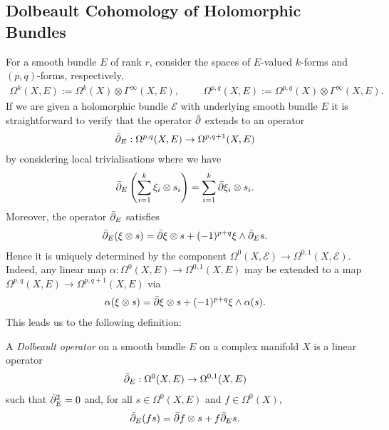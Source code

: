 \documentclass[12pt]{ociamthesis}  %
\begin{document}
\subsection{Dolbeault Cohomology of Holomorphic Bundles}

For a smooth bundle $E$ of rank $r$, consider the spaces of
$E$-valued $k$-forms and $(p,q)$-forms, respectively,
\begin{align*}
  \Omega^k(X,E) := \Omega^k(X)\otimes\Gamma^\infty(X,E),\hspace{1cm}
  \Omega^{p,q}(X,E) := \Omega^{p,q}(X)\otimes\Gamma^\infty(X,E).
\end{align*}
If we are given a holomorphic bundle $\mathcal E$ with underlying
smooth bundle $E$
it is straightforward to verify that the operator $\bar{\partial}$ extends
to an operator
\begin{align}\label{eq:general_dolbeault_operator}
  \bar{\partial}_E : \Omega^{p,q}(X,E) \to \Omega^{p,q+1}(X,E)
\end{align}
by considering local trivialisations where we have
\begin{align*}
  \bar{\partial}_E \left({\sum_{i=1}^k \xi_i \otimes s_i}\right)
  = \sum_{i=1}^k \bar{\partial} \xi_i \otimes s_i.
\end{align*}
Moreover, the operator $\bar{\partial}_E$ satisfies
\begin{align*}
  \bar{\partial}_E(\xi \otimes s) = \bar{\partial}\xi \otimes s + (-1)^{p+q} \xi \wedge \bar{\partial}_E s.
\end{align*}
Hence it is uniquely determined by the component
$\Omega^0(X,\mathcal E) \to \Omega^{0,1}(X,\mathcal E)$. Indeed,
any linear map $\alpha : \Omega^0(X,E) \to \Omega^{0,1}(X,E)$ may be
extended to a map $\Omega^{p,q}(X,E) \to \Omega^{p,q+1}(X,E)$
via
\begin{align*}
  \alpha(\xi \otimes s) = \bar{\partial}\xi \otimes s + (-1)^{p+q}\xi\wedge \alpha(s).
\end{align*}
This leads us to the following definition:

\begin{definition}
  A \emph{Dolbeault operator} on a smooth bundle $E$ on a complex
  manifold $X$ is a linear operator
  \begin{align*}
    \bar{\partial}_E : \Omega^0(X,E) \to \Omega^{0,1}(X,E)
  \end{align*}
  such that $\bar{\partial}_E^2 = 0$ and, for all $s\in\Omega^0(X,E)$ and
  $f\in \Omega^0(X)$,
  \begin{align*}
    \bar{\partial}_E (fs) = \bar{\partial} f\otimes s + f \bar{\partial}_E s.
  \end{align*}
\end{definition}
\end{document}

